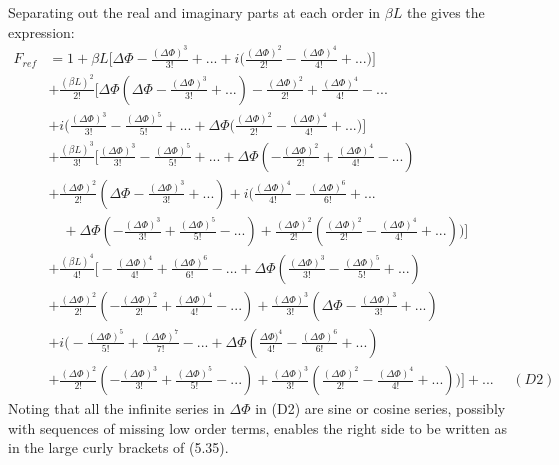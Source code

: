 \documentclass [12pt]{article}
\begin{document}
{   Separating out the real and imaginary parts at each order in  $\beta L$ the gives the expression:
   \begin{align}
 F_{ref}  & =  1+\beta L \biggl[\Delta \Phi -\frac{(\Delta \Phi)^3}{3!} +...
         +i\biggl( \frac{(\Delta \Phi)^2}{2!}-\frac{(\Delta \Phi)^4}{4!} +...\biggr) \biggr]\nonumber \\
       &+  \frac{(\beta L)^2}{2!} \biggl[\Delta \Phi( \Delta \Phi-\frac{(\Delta \Phi)^3}{3!}+...)
        -\frac{(\Delta \Phi)^2}{2!}+\frac{(\Delta \Phi)^4}{4!}-... \nonumber \\
       &+  i\biggl(\frac{(\Delta \Phi)^3}{3!}-\frac{(\Delta \Phi)^5}{5!}+...
           + \Delta \Phi(\frac{(\Delta \Phi)^2}{2!}-\frac{(\Delta \Phi)^4}{4!}+...\biggr)\biggr]
       \nonumber \\
       &+   \frac{(\beta L)^3}{3!} \biggl[\frac{(\Delta \Phi)^3}{3!}-\frac{(\Delta \Phi)^5}{5!}+...
        +  \Delta \Phi(-\frac{(\Delta \Phi)^2}{2!}+\frac{(\Delta \Phi)^4}{4!}-...)\nonumber\\
        & + \frac{(\Delta \Phi)^2}{2!}(\Delta \Phi-\frac{(\Delta \Phi)^3}{3!}+...) 
       +   i\biggl(\frac{(\Delta \Phi)^4}{4!}-\frac{(\Delta \Phi)^6}{6!}+...\nonumber\\
        &\quad + \Delta \Phi(-\frac{(\Delta \Phi)^3}{3!}+\frac{(\Delta \Phi)^5}{5!}-...)
        + \frac{(\Delta \Phi)^2}{2!}(\frac{(\Delta \Phi)^2}{2!}-\frac{(\Delta \Phi)^4}{4!}+...)\biggr)
       \biggr]   \nonumber \\
       &+   \frac{(\beta L)^4}{4!}\biggl[-\frac{(\Delta \Phi)^4}{4!}+\frac{(\Delta \Phi)^6}{6!}-...
            +\Delta \Phi(\frac{(\Delta \Phi)^3}{3!}-\frac{(\Delta \Phi)^5}{5!}+...) 
         \nonumber \\
        &+  \frac{(\Delta \Phi)^2}{2!}(-\frac{(\Delta \Phi)^2}{2!}+\frac{(\Delta \Phi)^4}{4!}-...)
           +\frac{( \Delta \Phi)^3}{3!}(\Delta \Phi-\frac{(\Delta \Phi)^3}{3!}+...)    \nonumber \\
        &  + i\biggl(-\frac{(\Delta \Phi)^5}{5!}+\frac{(\Delta \Phi)^7}{7!}-...
        + \Delta \Phi(\frac{\Delta \Phi)^4}{4!}-\frac{(\Delta \Phi)^6}{6!}+...)
          \nonumber \\
        &+  \frac{(\Delta \Phi)^2}{2!}(-\frac{(\Delta \Phi)^3}{3!}+\frac{(\Delta \Phi)^5}{5!}-...)
           +\frac{( \Delta \Phi)^3}{3!}(\frac{(\Delta \Phi)^2}{2!}-\frac{(\Delta \Phi)^4}{4!}+...)\biggr) \biggr]
         +... \nonumber ~~~~~~(D2)
     \end{align}     
  Noting that all the infinite series in $\Delta \Phi$ in (D2) are sine or cosine series, possibly with sequences
  of missing low order terms,
  enables the right side to be written as in the large curly brackets of (5.35).

}
\end{document}
